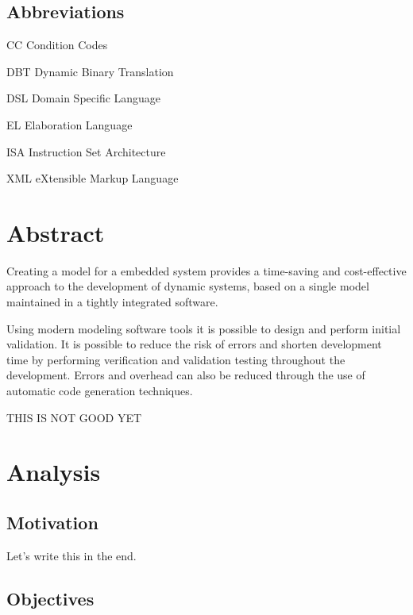 \documentclass{report}
\newenvironment{abbreviations}{\begin{list}{}{\renewcommand{\makelabel}{\abbrlabel}}}{\end{list}}
\newcommand{\abbrlabel}[1]{\makebox[3cm][l]{\textbf{#1}\ \dotfill}}
\begin{document}
\section*{Abbreviations}
\begin{abbreviations} 
	\item[CC] Condition Codes
	\item[DBT] Dynamic Binary Translation
	\item[DSL] Domain Specific Language
	\item[EL] Elaboration Language
	\item[ISA] Instruction Set Architecture
	\item[XML] eXtensible Markup Language
\end{abbreviations}
\newpage
\chapter{Abstract}

\par Creating a model for a embedded system provides a time-saving and cost-effective approach to the development of dynamic systems, based on a single model maintained in a tightly integrated software. 
\par Using modern modeling software tools it is possible to design and perform initial validation. It is possible to reduce the risk of errors and shorten development time by performing verification and validation testing throughout the development. Errors and overhead can also be reduced through the use of automatic code generation techniques\cite{j.h.foleissa.l.t.d'amatoa.f.dasilva2012}.

\par THIS IS NOT GOOD YET
\chapter{Analysis}

	\section{Motivation}
	
	\par Let's write this in the end.

	\section{Objectives}
	
\end{document}
